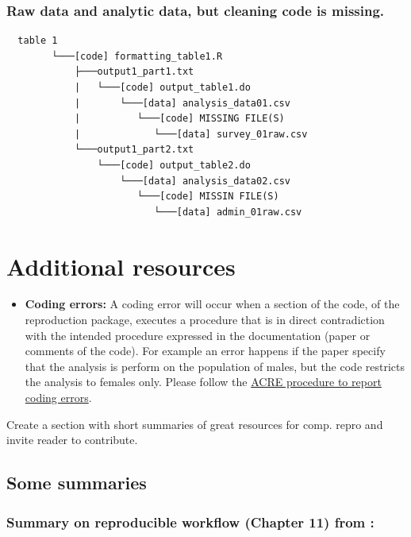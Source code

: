 \documentclass[]{book}
\providecommand{\tightlist}{%
  \setlength{\itemsep}{0pt}\setlength{\parskip}{0pt}}
\begin{document}
\hypertarget{raw-data-and-analytic-data-but-cleaning-code-is-missing.}{%
\subsection{Raw data and analytic data, but cleaning code is missing.}\label{raw-data-and-analytic-data-but-cleaning-code-is-missing.}}

\begin{verbatim}
  table 1
        └───[code] formatting_table1.R
            ├───output1_part1.txt  
            |   └───[code] output_table1.do           
            |       └───[data] analysis_data01.csv
            |          └───[code] MISSING FILE(S)
            |             └───[data] survey_01raw.csv
            └───output1_part2.txt  
                └───[code] output_table2.do           
                    └───[data] analysis_data02.csv
                       └───[code] MISSIN FILE(S)
                          └───[data] admin_01raw.csv  
\end{verbatim}

\hypertarget{additional-resources}{%
\chapter{Additional resources}\label{additional-resources}}

\begin{itemize}
\tightlist
\item
  \textbf{Coding errors:} A coding error will occur when a section of the code, of the reproduction package, executes a procedure that is in direct contradiction with the intended procedure expressed in the documentation (paper or comments of the code). For example an error happens if the paper specify that the analysis is perform on the population of males, but the code restricts the analysis to females only. Please follow the \href{ADD\%20LINK}{ACRE procedure to report coding errors}.
\end{itemize}

Create a section with short summaries of great resources for comp. repro and invite reader to contribute.

\hypertarget{some-summaries}{%
\section{Some summaries}\label{some-summaries}}

\hypertarget{summary-on-reproducible-workflow-chapter-11-from-christensen2019transparent}{%
\subsection{\texorpdfstring{Summary on reproducible workflow (Chapter 11) from \citet{christensen2019transparent}:}{Summary on reproducible workflow (Chapter 11) from @christensen2019transparent:}}\label{summary-on-reproducible-workflow-chapter-11-from-christensen2019transparent}}
\end{document}
